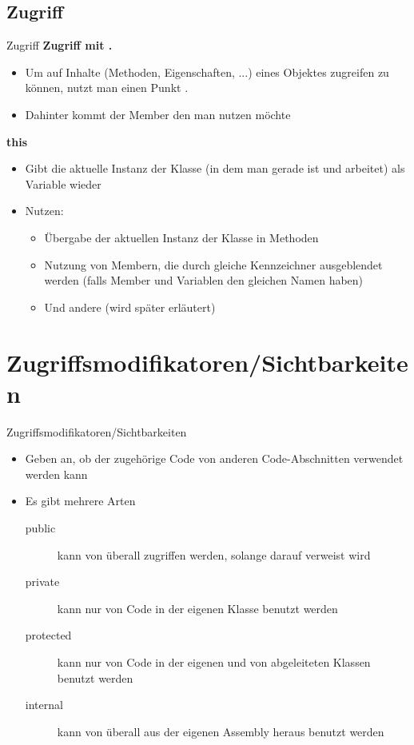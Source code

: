 \subsection{Zugriff}
\begin{frame}{Zugriff}
	\textbf{Zugriff mit .}\\
	\begin{itemize}
		\item Um auf Inhalte (Methoden, Eigenschaften, ...) eines Objektes zugreifen zu können, nutzt man einen Punkt \alert{.}
		\item Dahinter kommt der Member den man nutzen möchte
	\end{itemize}
	\textbf{this}\\
	\begin{itemize}
		\item Gibt die aktuelle Instanz der Klasse (in dem man gerade ist und arbeitet) als Variable wieder
		\item Nutzen:
		\begin{itemize}
			\item Übergabe der aktuellen Instanz der Klasse in Methoden
			\item Nutzung von Membern, die durch gleiche Kennzeichner ausgeblendet werden (falls Member und Variablen den gleichen Namen haben)
			\item Und andere (wird später erläutert)
		\end{itemize}
	\end{itemize}
\end{frame}

\section{Zugriffsmodifikatoren/Sichtbarkeiten}
\begin{frame}{Zugriffsmodifikatoren/Sichtbarkeiten}
	\begin{itemize}
		\item Geben an, ob der zugehörige Code von anderen Code-Abschnitten verwendet werden kann
		\item Es gibt mehrere Arten
		\begin{description}
			\item[public] kann von überall zugriffen werden, solange darauf verweist wird
			\item[private] kann nur von Code in der eigenen Klasse benutzt werden
			\item[protected] kann nur von Code in der eigenen und von abgeleiteten Klassen benutzt werden
			\item[internal] kann von überall aus der eigenen Assembly heraus benutzt werden
		\end{description}
	\end{itemize}
\end{frame}

